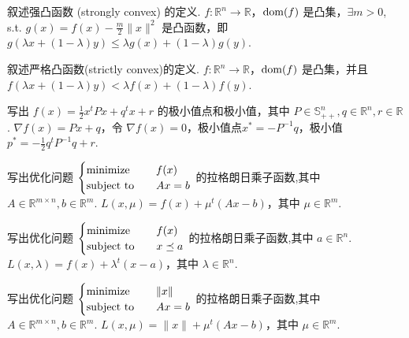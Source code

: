 \begin{problem}[问答]
    叙述强凸函数 (strongly convex) 的定义.
    \Answer $f:\mathbb{R}^n \to \mathbb{R}$，$\operatorname{dom}(f)$ 是凸集，$\exists m > 0$, s.t. $g(x) = f(x) - \frac{m}{2}\|x\|^2$ 是凸函数，即 $g(\lambda x + (1 - \lambda)y) \le \lambda g(x) + (1 - \lambda)g(y)$.
\end{problem}

\begin{problem}[问答]
    叙述严格凸函数(strictly convex)的定义.
    \Answer $f:\mathbb{R}^n \to \mathbb{R}$，$\operatorname{dom}(f)$ 是凸集，并且 $f(\lambda x + (1 - \lambda)y) < \lambda f(x) + (1 - \lambda)f(y)$.
\end{problem}

\begin{problem}[问答]
    写出 $f(x) = \frac{1}{2}x^tPx + q^tx + r$ 的极小值点和极小值，其中 $P \in \mathbb{S}_{++}^n, q \in \mathbb{R}^n, r \in \mathbb{R}$.
    \Answer $\nabla f(x) = Px + q$，令 $\nabla f(x) = 0$，极小值点$x^* = -P^{-1}q$，极小值 $p^* = -\frac{1}{2}q^tP^{-1}q + r$.
\end{problem}

\begin{problem}[问答]
    写出优化问题 $\begin{cases}
        \operatorname{minimize} \quad &f(x)\\
        \operatorname{subject\ to} \quad &Ax = b
    \end{cases}$ 的拉格朗日乘子函数,其中 $A \in \mathbb{R}^{m \times n}, b \in \mathbb{R}^m$.
    \Answer $L(x, \mu) = f(x) + \mu^t(Ax - b)$，其中 $\mu \in \mathbb{R}^m$.
\end{problem}

\begin{problem}[问答]
    写出优化问题 $\begin{cases}
        \operatorname{minimize} \quad &f(x)\\
        \operatorname{subject\ to} \quad &x \preceq a
    \end{cases}$ 的拉格朗日乘子函数,其中 $a \in \mathbb{R}^n$.
    \Answer $L(x, \lambda) = f(x) + \lambda^t(x - a)$，其中 $\lambda \in \mathbb{R}^n$.
\end{problem}

\begin{problem}[问答]
    写出优化问题 $\begin{cases}
        \operatorname{minimize} \quad &\|x\| \\
        \operatorname{subject\ to} \quad &Ax = b
    \end{cases}$ 的拉格朗日乘子函数,其中 $A \in \mathbb{R}^{m \times n}, b \in \mathbb{R}^m$.
    \Answer $L(x, \mu) = \|x\| + \mu^t(Ax - b)$，其中 $\mu \in \mathbb{R}^m$.
\end{problem}

